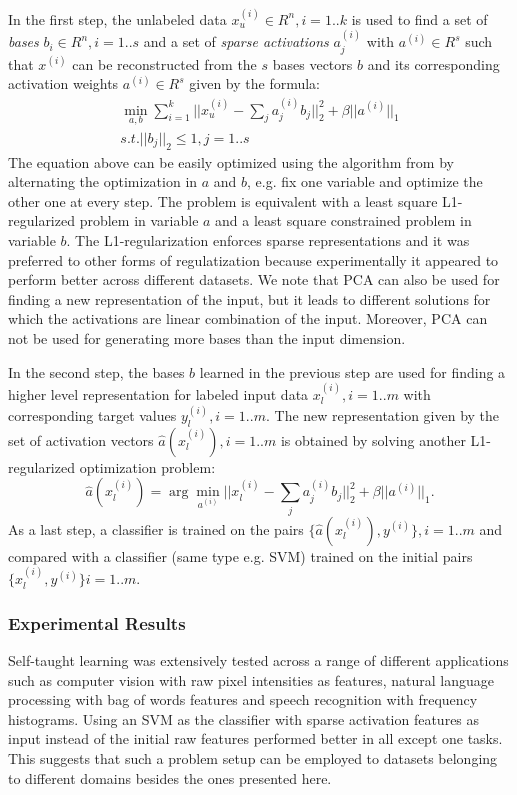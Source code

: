 \documentclass[10pt,journal,a4paper]{IEEEtran}
\begin{document}
In the first step, the unlabeled data $x^{(i)}_u \in R^n, i=1..k$ is used to find a set of \textit{bases} $b_i \in R^n, i=1..s$ and a set of \textit{sparse activations} $a_j^{(i)}$ with $a^{(i)}\in R^s$ such that $x^{(i)}$ can
be reconstructed from the $s$ bases vectors $b$ and its corresponding activation weights $a^{(i)} \in R^s$ given by the formula:
\begin{equation}
\begin{array}{c }
	\min_{a,b} \sum_{i=1}^k ||x_u^{(i)} - \sum_j a_j^{(i)} b_j||_2^2 + \beta||a^{(i)}||_1    \\
	 s.t. ||b_j||_2 \leq 1, j=1..s
	\end{array}
\end{equation}
The equation above can be easily optimized using the algorithm from \cite{sparsetraining} by alternating the optimization in $a$ and $b$, e.g. fix one variable and optimize the other one at every step.
The problem is equivalent with a least square L1-regularized problem in variable $a$ and a least square constrained problem in  variable $b$. The L1-regularization enforces sparse representations and it was preferred to other forms of regulatization because experimentally it appeared to perform better across different datasets. We note that PCA can also be used for finding a new representation of the input, but it leads to different solutions for which the activations are linear combination of the input. Moreover,  PCA can not be used for generating more bases than the input dimension.


In the second step, the bases $b$ learned in the previous step are used for finding a higher level representation for labeled input data $x_l^{(i)}, i=1..m$ with corresponding target values $y_l^{(i)}, i=1..m$. The new representation given by the set of activation vectors $\hat{a}(x_l^{(i)}), i=1..m$ is obtained by solving another L1- regularized optimization problem:
\begin{equation}
\hat{a}(x_l^{(i)}) = \arg\min_{a^{(i)}}|| x_l^{(i)} - \sum_j a_j^{(i)}b_j||_2^2 + \beta||a^{(i)}||_1.
\end{equation}
As a last step, a classifier is trained on the pairs $\{\hat{a}(x_l^{(i)}), y^{(i)}\} , i=1..m$ and compared with a classifier (same type e.g. SVM) trained on the initial pairs $\{x_l^{(i)}, y^{(i)}\} i=1..m$.


\subsubsection{Experimental Results}
Self-taught learning was extensively tested across a range of different applications such as computer vision with raw pixel intensities as features, natural language processing with bag of words features and speech recognition with frequency histograms. Using an SVM as the classifier with sparse activation features as input instead of the initial raw features performed better in all except one tasks. This suggests that such a problem setup can be employed to datasets belonging to different domains besides the ones presented here.
\end{document}
